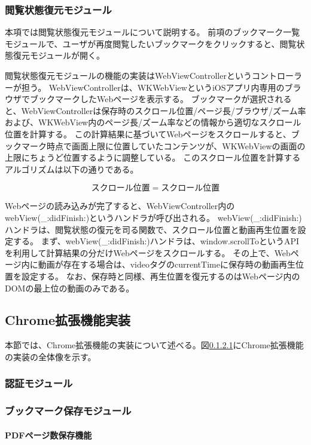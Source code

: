 \subsubsection{閲覧状態復元モジュール}
本項では閲覧状態復元モジュールについて説明する。
前項のブックマーク一覧モジュールで、ユーザが再度閲覧したいブックマークをクリックすると、閲覧状態復元モジュールが開く。

閲覧状態復元モジュールの機能の実装はWebViewControllerというコントローラーが担う。
WebViewControllerは、WKWebViewというiOSアプリ内専用のブラウザでブックマークしたWebページを表示する。
ブックマークが選択されると、WebViewControllerは保存時のスクロール位置/ページ長/ブラウザ/ズーム率および、WKWebView内のページ長/ズーム率などの情報から適切なスクロール位置を計算する。
この計算結果に基づいてWebページをスクロールすると、ブックマーク時点で画面上限に位置していたコンテンツが、WKWebViewの画面の上限にちょうど位置するように調整している。
このスクロール位置を計算するアルゴリズムは以下の通りである。

\begin{equation}
スクロール位置 = スクロール位置
\end{equation}

Webページの読み込みが完了すると、WebViewController内のwebView(\_:didFinish:)\cite{didFinish}というハンドラが呼び出される。
webView(\_:didFinish:)ハンドラは、閲覧状態の復元を司る関数で、スクロール位置と動画再生位置を設定する。
まず、webView(\_:didFinish:)ハンドラは、window.scrollToというAPIを利用して計算結果の分だけWebページをスクロールする。
その上で、Webページ内に動画が存在する場合は、videoタグのcurrentTimeに保存時の動画再生位置を設定する。
なお、保存時と同様、再生位置を復元するのはWebページ内のDOMの最上位の動画のみである。

\subsection{Chrome拡張機能実装}
本節では、Chrome拡張機能の実装について述べる。図\ref{}にChrome拡張機能の実装の全体像を示す。

\subsubsection{認証モジュール}

\subsubsection{ブックマーク保存モジュール}

\paragraph{PDFページ数保存機能}

